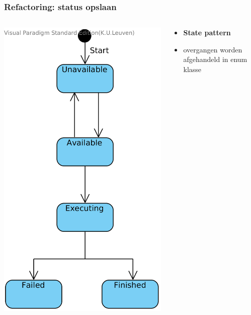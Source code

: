 \documentclass{beamer}
\begin{document}
\begin{frame}
\frametitle {Refactoring: status opslaan}
\begin{columns}
	\begin{column}{0.3\textwidth}
		\includegraphics[scale=0.7]{figures/statediagram}
	\end{column}
	\begin{column}{0.69\textwidth}
		\begin{itemize}
		\item \textbf{State pattern}
		\item overgangen worden afgehandeld in enum klasse
		
		\end{itemize}
	\end{column}
\end{columns}


\end{frame}
\end{document}
